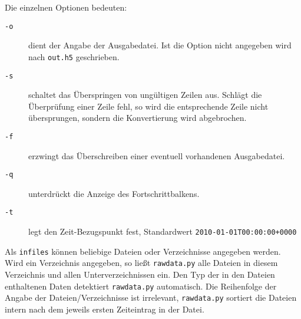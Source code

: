 \documentclass[version=last,
	a4paper,			%
	pagesize, 			%
	11pt,				%
	BCOR1cm,			%
	DIV12,	 			%
	pointlessnumbers,   %
	halfparskip,		%
]{scrreprt}
\begin{document}
Die einzelnen Optionen bedeuten:
\begin{description}
  \item[\verb"-o"] dient der Angabe der Ausgabedatei. Ist die Option nicht angegeben wird nach \texttt{out.h5} geschrieben.
  \item[\verb"-s"] schaltet das Überspringen von ungültigen Zeilen aus. Schlägt die Überprüfung einer Zeile fehl, so wird die entsprechende Zeile nicht übersprungen, sondern die Konvertierung wird abgebrochen.
  \item[\verb"-f"] erzwingt das Überschreiben einer eventuell vorhandenen Ausgabedatei.
  \item[\verb"-q"] unterdrückt die Anzeige des Fortschrittbalkens.
  \item[\verb"-t"] legt den Zeit-Bezugspunkt fest, Standardwert \texttt{2010-01-01T00:00:00+0000}
\end{description}

Als \texttt{infiles} können beliebige Dateien oder Verzeichnisse angegeben werden. Wird ein Verzeichnis angegeben, so ließt \texttt{rawdata.py} alle Dateien in diesem Verzeichnis und allen Unterverzeichnissen ein. Den Typ der in den Dateien enthaltenen Daten detektiert \texttt{rawdata.py} automatisch. Die Reihenfolge der Angabe der Dateien/Verzeichnisse ist irrelevant, \texttt{rawdata.py} sortiert die Dateien intern nach dem jeweils ersten Zeiteintrag in der Datei.
\end{document}
